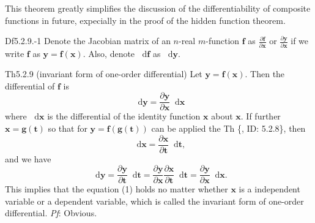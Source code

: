 \documentclass{article}
\newcommand{\parfrac}[2]{\frac{\partial #1}{\partial #2}}
\newcommand{\dif}{\mathop{}\!\mathrm{d}}
\begin{document}
\begin{Rmk}{}
    This theorem greatly simplifies the discussion of the differentiability of composite functions in future, expecially in the proof of the hidden function theorem.
\end{Rmk}

\begin{Df}{Df5.2.9.-1}
    Denote the Jacobian matrix of an $n$-real $m$-function $\pmb{f}$ as $\parfrac{\pmb{f}}{\pmb{x}}$ or $\parfrac{\pmb{y}}{\pmb{x}}$ if we write $\pmb{f}$ as $\pmb{y} = \pmb{f}(\pmb{x})$. Also, denote $\dif\pmb{f}$ as $\dif\pmb{y}$.
\end{Df}

\begin{Th}{Th5.2.9 (invariant form of one-order differential)}
    Let $\pmb{y} = \pmb{f}(\pmb{x})$. Then the differential of $\pmb{f}$ is
    \begin{equation}
        \dif\pmb{y} = \parfrac{\pmb{y}}{\pmb{x}}\dif\pmb{x}
        \tag{1}
    \end{equation}
    where $\dif\pmb{x}$ is the differential of the identity function $\pmb{x}$ about $\pmb{x}$.
    If further $\pmb{x} = \pmb{g}(\pmb{t})$ so that for $\pmb{y} = \pmb{f}(\pmb{g}(\pmb{t}))$ can be applied the Th \{, ID: 5.2.8\}, then
    $$ \dif\pmb{x} = \parfrac{\pmb{x}}{\pmb{t}}\dif\pmb{t}, $$
    and we have
    $$ \dif\pmb{y} = \parfrac{\pmb{y}}{\pmb{t}}\dif\pmb{t} = \parfrac{\pmb{y}}{\pmb{x}}\parfrac{\pmb{x}}{\pmb{t}}\dif\pmb{t} = \parfrac{\pmb{y}}{\pmb{x}}\dif\pmb{x}. $$
    This implies that the equation (1) holds no matter whether $\pmb{x}$ is a independent variable or a dependent variable, \textcolor{Df}{which is called the invariant form of one-order differential.}
    \tcblower
    \textit{Pf}: Obvious.
\end{Th}
\end{document}
